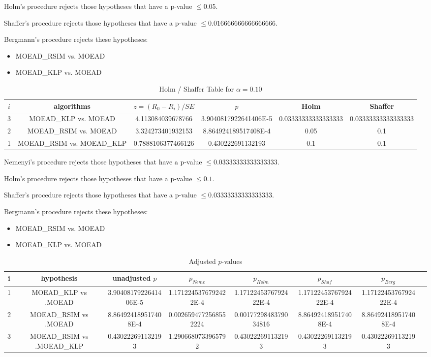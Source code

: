 \documentclass[a4paper,10pt]{article}
\begin{document}
\begin{landscape}
Holm's procedure rejects those hypotheses that have a p-value $\le0.05$.


Shaffer's procedure rejects those hypotheses that have a p-value $\le0.016666666666666666$.


Bergmann's procedure rejects these hypotheses:


\begin{itemize}


\item MOEAD_RSIM vs. MOEAD
\item MOEAD_KLP vs. MOEAD
\end{itemize}


\begin{table}[!htp]
\centering\tiny
\caption{Holm / Shaffer Table for $\alpha=0.10$}
\begin{tabular}{cccccc}
$i$&algorithms&$z=(R_0 - R_i)/SE$&$p$&Holm&Shaffer\\
\hline
3&MOEAD_KLP vs. MOEAD&4.113084039678766&3.9040817922641406E-5&0.03333333333333333&0.03333333333333333\\
2&MOEAD_RSIM vs. MOEAD&3.324273401932153&8.864924189517408E-4&0.05&0.1\\
1&MOEAD_RSIM vs. MOEAD_KLP&0.7888106377466126&0.430222691132193&0.1&0.1\\
\hline
\end{tabular}
\end{table}
Nemenyi's procedure rejects those hypotheses that have a p-value $\le0.03333333333333333$.


Holm's procedure rejects those hypotheses that have a p-value $\le0.1$.


Shaffer's procedure rejects those hypotheses that have a p-value $\le0.03333333333333333$.


Bergmann's procedure rejects these hypotheses:


\begin{itemize}


\item MOEAD_RSIM vs. MOEAD
\item MOEAD_KLP vs. MOEAD
\end{itemize}


\begin{table}[!htp]
\centering\tiny
\caption{Adjusted $p$-values}
\begin{tabular}{cccccccc}
i&hypothesis&unadjusted $p$&$p_{Neme}$&$p_{Holm}$&$p_{Shaf}$&$p_{Berg}$\\
\hline
1&MOEAD_KLP vs .MOEAD&3.9040817922641406E-5&1.1712245376792422E-4&1.1712245376792422E-4&1.1712245376792422E-4&1.1712245376792422E-4\\
2&MOEAD_RSIM vs .MOEAD&8.864924189517408E-4&0.0026594772568552224&0.0017729848379034816&8.864924189517408E-4&8.864924189517408E-4\\
3&MOEAD_RSIM vs .MOEAD_KLP&0.430222691132193&1.2906680733965792&0.430222691132193&0.430222691132193&0.430222691132193\\
\hline
\end{tabular}
\end{table}

\end{landscape}
\end{document}
